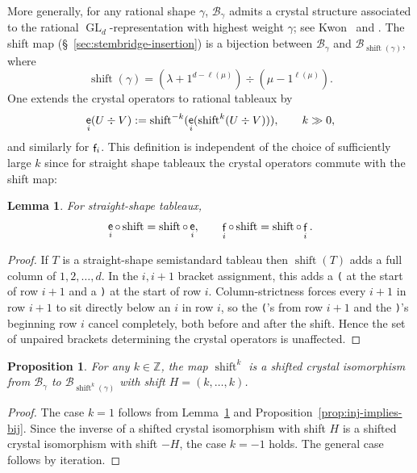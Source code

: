 \documentclass[12pt]{amsart}
\DeclareMathOperator{\tabe}{{\sf e}}
\DeclareMathOperator{\tabf}{{\sf f}}
\newtheorem{lemma}[theorem]{Lemma}
\newtheorem{proposition}[theorem]{Proposition}
\theoremstyle{definition}
\theoremstyle{remark}
\begin{document}
More generally, for any rational shape $\gamma$, $\mathcal{B}_\gamma$ admits a crystal structure 
associated to the rational $\operatorname{GL}_d$-representation with highest weight $\gamma$; see Kwon~\cite[\S~5.3, Lemma~5.8]{Kwon} and
\cite[\S~3.4]{Kwon2}. The shift map (\S~\ref{sec:stembridge-insertion}) is a bijection between $\mathcal{B}_\gamma$ and $\mathcal{B}_{\operatorname{shift}(\gamma)}$, where
\[\operatorname{shift}(\gamma) = (\lambda + 1^{d-\ell(\mu)})\div (\mu - 1^{\ell(\mu)}).\]
One extends the crystal operators to rational tableaux by
\begin{equation}
\label{eqn:Apr30ccc}
\tabe_i(U\div V) := \operatorname{shift}^{-k}(\tabe_i(\operatorname{shift}^k(U \div V))), \qquad k\gg 0,
\end{equation}
and similarly for $\tabf_i$. This definition is independent of the choice of
sufficiently large $k$ since 
for straight shape tableaux the crystal operators commute with the shift map:
\begin{lemma}\label{lemma:June18zzz}
For straight-shape tableaux,
\[\tabe_i \circ \operatorname{shift}=\operatorname{shift}\circ\tabe_i,
\qquad \tabf_i \circ \operatorname{shift} = \operatorname{shift}\circ\tabf_i.\]
\end{lemma}
\begin{proof}
If $T$ is a straight-shape semistandard tableau then $\operatorname{shift}(T)$
adds a full column of $1,2,\ldots,d$.
In the $i,i+1$ bracket assignment, this adds a {\tt (} at the start of row $i+1$ and a {\tt )} at the start of row
$i$. Column-strictness forces every $i+1$ in row $i+1$ to sit directly below an $i$ in row $i$, so the {\tt (}'s
from row $i+1$ and the {\tt )}'s beginning row $i$ cancel completely, both before and after the shift.
Hence the set of unpaired brackets determining the crystal
operators is unaffected.
\end{proof}

\begin{proposition} \label{prop:tableau-shift-isomorphism}
For any $k\in\mathbb Z$, the map $\operatorname{shift}^k$ is a shifted
crystal isomorphism from $\mathcal{B}_\gamma$ to
$\mathcal{B}_{\operatorname{shift}^k(\gamma)}$ with shift
$H=(k,\ldots,k)$.
\end{proposition}
\begin{proof}
The case $k=1$ follows from Lemma~\ref{lemma:June18zzz} and
Proposition~\ref{prop:inj-implies-bij}. Since the inverse of a shifted
crystal isomorphism with shift $H$ is a shifted crystal isomorphism with
shift $-H$, the case $k=-1$ holds. The general case follows by iteration.
\end{proof}
\end{document}

